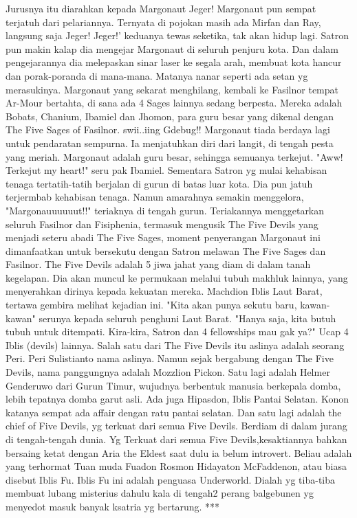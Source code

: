 \documentclass[a4paper,11pt,final]{article}
\begin{document}
Jurusnya itu diarahkan kepada Margonaut Jeger! Margonaut pun sempat terjatuh dari pelariannya. Ternyata di pojokan masih ada Mirfan dan Ray, langsung saja Jeger! Jeger!' keduanya tewas seketika, tak akan hidup lagi.
Satron pun makin kalap dia mengejar Margonaut di seluruh penjuru kota. Dan dalam pengejarannya dia melepaskan sinar laser ke segala arah, membuat kota hancur dan porak-poranda di mana-mana. Matanya nanar seperti ada setan yg merasukinya.
Margonaut yang sekarat menghilang, kembali ke Fasilnor tempat Ar-Mour bertahta, di sana ada 4 Sages lainnya sedang berpesta. Mereka adalah Bobats, Chanium, Ibamiel dan Jhomon, para guru besar yang dikenal dengan The Five Sages of Fasilnor.
swii..iing Gdebug!! Margonaut tiada berdaya lagi untuk pendaratan sempurna. Ia menjatuhkan diri dari langit, di tengah pesta yang meriah. Margonaut adalah guru besar, sehingga semuanya terkejut. "Aww! Terkejut my heart!" seru pak Ibamiel.
Sementara Satron yg mulai kehabisan tenaga tertatih-tatih berjalan di gurun di batas luar kota. Dia pun jatuh terjermbab kehabisan tenaga. Namun amarahnya semakin menggelora, "Margonauuuuuut!!" teriaknya di tengah gurun.
Teriakannya menggetarkan seluruh Fasilnor dan Fisiphenia, termasuk mengusik The Five Devils yang menjadi seteru abadi The Five Sages, moment penyerangan Margonaut ini dimanfaatkan untuk bersekutu dengan Satron melawan The Five Sages dan Fasilnor.
The Five Devils adalah 5 jiwa jahat yang diam di dalam tanah kegelapan. Dia akan muncul ke permukaan melalui tubuh makhluk lainnya, yang menyerahkan dirinya kepada kekuatan mereka.
Machdion Iblis Laut Barat, tertawa gembira melihat kejadian ini. "Kita akan punya sekutu baru, kawan-kawan" serunya kepada seluruh penghuni Laut Barat.
"Hanya saja, kita butuh tubuh untuk ditempati. Kira-kira, Satron dan 4 fellowships mau gak ya?" Ucap 4 Iblis (devils) lainnya.
Salah satu dari The Five Devils itu aslinya adalah seorang Peri. Peri Sulistianto nama aslinya. Namun sejak bergabung dengan The Five Devils, nama panggungnya adalah Mozzlion Pickon.
Satu lagi adalah Helmer Genderuwo dari Gurun Timur, wujudnya berbentuk manusia berkepala domba, lebih tepatnya domba garut asli.
Ada juga Hipasdon, Iblis Pantai Selatan. Konon katanya sempat ada affair dengan ratu pantai selatan.
Dan satu lagi adalah the chief of Five Devils, yg terkuat dari semua Five Devils. Berdiam di dalam jurang di tengah-tengah dunia. Yg Terkuat dari semua Five Devils,kesaktiannya bahkan bersaing ketat dengan Aria the Eldest saat dulu ia belum introvert.
Beliau adalah yang terhormat Tuan muda Fuadon Rosmon Hidayaton McFaddenon, atau biasa disebut Iblis Fu.
Iblis Fu ini adalah penguasa Underworld. Dialah yg tiba-tiba membuat lubang misterius dahulu kala di tengah2 perang balgebunen yg menyedot masuk banyak ksatria yg bertarung.
***
\end{document}
